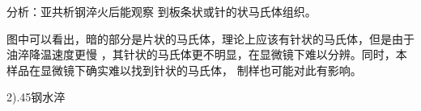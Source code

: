 \documentclass[a4paper,utf8]{article}
\begin{document}
\begin{figure}[!ht]
    \begin{floatrow}
    \end{floatrow}

\end{figure}

分析：亚共析钢淬火后能观察
到板条状或针的状马氏体组织。

图中可以看出，暗的部分是片状的马氏体，理论上应该有针状的马氏体，但是由于油淬降温速度更慢
，其针状的马氏体更不明显，在显微镜下难以分辨。同时，本样品在显微镜下确实难以找到针状的马氏体，
制样也可能对此有影响。

2).45钢水淬

\begin{figure}[!ht]
    \begin{floatrow}
    \end{floatrow}

\end{figure}
\end{document}
